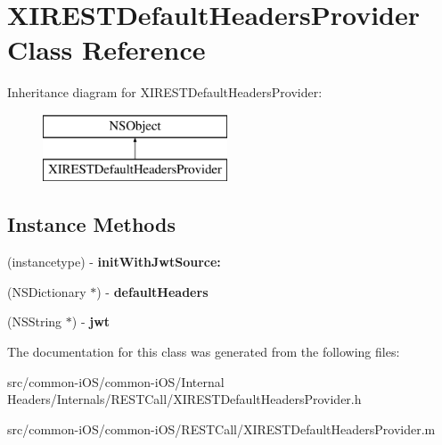 \hypertarget{interface_x_i_r_e_s_t_default_headers_provider}{}\section{X\+I\+R\+E\+S\+T\+Default\+Headers\+Provider Class Reference}
\label{interface_x_i_r_e_s_t_default_headers_provider}
Inheritance diagram for X\+I\+R\+E\+S\+T\+Default\+Headers\+Provider\+:\begin{figure}[H]
\begin{center}
\leavevmode
\includegraphics[height=2.000000cm]{interface_x_i_r_e_s_t_default_headers_provider}
\end{center}
\end{figure}
\subsection*{Instance Methods}
\begin{DoxyCompactItemize}
\item 
\hypertarget{interface_x_i_r_e_s_t_default_headers_provider_a9219b192f132572bf164531fbd5e34ca}{}\label{interface_x_i_r_e_s_t_default_headers_provider_a9219b192f132572bf164531fbd5e34ca} 
(instancetype) -\/ {\bfseries init\+With\+Jwt\+Source\+:}
\item 
\hypertarget{interface_x_i_r_e_s_t_default_headers_provider_a42e1a4c5767c1f1582832b106117a6dc}{}\label{interface_x_i_r_e_s_t_default_headers_provider_a42e1a4c5767c1f1582832b106117a6dc} 
(N\+S\+Dictionary $\ast$) -\/ {\bfseries default\+Headers}
\item 
\hypertarget{interface_x_i_r_e_s_t_default_headers_provider_a18cde5675149b847bf86f402331858f4}{}\label{interface_x_i_r_e_s_t_default_headers_provider_a18cde5675149b847bf86f402331858f4} 
(N\+S\+String $\ast$) -\/ {\bfseries jwt}
\end{DoxyCompactItemize}


The documentation for this class was generated from the following files\+:\begin{DoxyCompactItemize}
\item 
src/common-\/i\+O\+S/common-\/i\+O\+S/\+Internal Headers/\+Internals/\+R\+E\+S\+T\+Call/X\+I\+R\+E\+S\+T\+Default\+Headers\+Provider.\+h\item 
src/common-\/i\+O\+S/common-\/i\+O\+S/\+R\+E\+S\+T\+Call/X\+I\+R\+E\+S\+T\+Default\+Headers\+Provider.\+m\end{DoxyCompactItemize}

